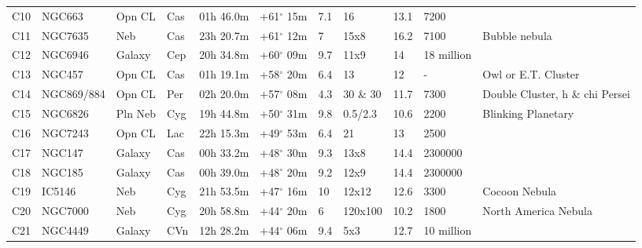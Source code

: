 \documentclass[10pt,twoside,a4paper,english]{article}
\begin{document}
\begin{longtable}{@{}lllllllllll@{}}
C10        & NGC663      & Opn CL     & Cas       & 01h 46.0m & +61$^{\circ}$ 15m  & 7.1       & 16                   & 13.1     & 7200                &                                 \\ 
C11        & NGC7635     & Neb        & Cas       & 23h 20.7m & +61$^{\circ}$ 12m  & 7         & 15x8                 & 16.2     & 7100                & Bubble nebula                   \\ 
C12        & NGC6946     & Galaxy     & Cep       & 20h 34.8m & +60$^{\circ}$ 09m  & 9.7       & 11x9                 & 14       & 18 million          &                                 \\ 
C13        & NGC457      & Opn CL     & Cas       & 01h 19.1m & +58$^{\circ}$ 20m  & 6.4       & 13                   & 12       & -                   & Owl or E.T. Cluster             \\ 
C14        & NGC869/884  & Opn CL     & Per       & 02h 20.0m & +57$^{\circ}$ 08m  & 4.3       & 30 \& 30             & 11.7     & 7300                & Double Cluster, h \& chi Persei \\ 
C15        & NGC6826     & Pln Neb    & Cyg       & 19h 44.8m & +50$^{\circ}$ 31m  & 9.8       & 0.5/2.3              & 10.6     & 2200                & Blinking Planetary              \\ 
C16        & NGC7243     & Opn CL     & Lac       & 22h 15.3m & +49$^{\circ}$ 53m  & 6.4       & 21                   & 13       & 2500                &                                 \\ 
C17        & NGC147      & Galaxy     & Cas       & 00h 33.2m & +48$^{\circ}$ 30m  & 9.3       & 13x8                 & 14.4     & 2300000             &                                 \\ 
C18        & NGC185      & Galaxy     & Cas       & 00h 39.0m & +48$^{\circ}$ 20m  & 9.2       & 12x9                 & 14.4     & 2300000             &                                 \\ 
C19        & IC5146      & Neb        & Cyg       & 21h 53.5m & +47$^{\circ}$ 16m  & 10        & 12x12                & 12.6     & 3300                & Cocoon Nebula                   \\ 
C20        & NGC7000     & Neb        & Cyg       & 20h 58.8m & +44$^{\circ}$ 20m  & 6         & 120x100              & 10.2     & 1800                & North America Nebula            \\ 
C21        & NGC4449     & Galaxy     & CVn       & 12h 28.2m & +44$^{\circ}$ 06m  & 9.4       & 5x3                  & 12.7     & 10 million          &                                 \\ 

\end{longtable}
\end{document}
